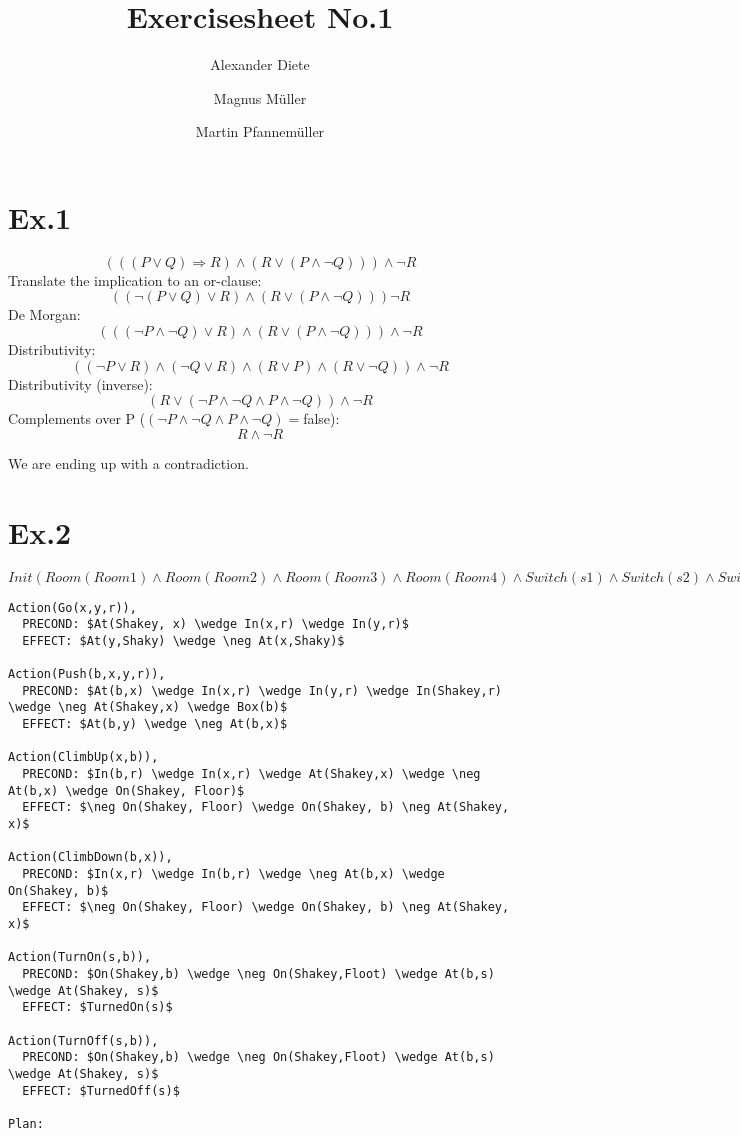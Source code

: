 \documentclass[11pt]{article}
\title{Exercisesheet No.1}
\author{Alexander Diete \and Magnus M\"uller \and Martin Pfannem\"uller}
\begin{document}
\maketitle
\section*{Ex.1}
$$(((P \vee Q) \Rightarrow R) \wedge (R \vee (P \wedge \neg Q))) \wedge \neg R$$
Translate the implication to an or-clause:
$$((\neg(P \vee Q) \vee R) \wedge (R \vee (P \wedge \neg Q))) \neg R$$
De Morgan:
$$(((\neg P \wedge \neg Q) \vee R) \wedge (R \vee (P \wedge \neg Q))) \wedge \neg R$$
Distributivity:
$$((\neg P \vee R) \wedge (\neg Q \vee R) \wedge (R \vee P) \wedge (R \vee \neg Q))\wedge \neg R$$
Distributivity (inverse):
$$(R \vee (\neg P \wedge \neg Q \wedge P \wedge \neg Q))\wedge \neg R$$
Complements over P ($(\neg P \wedge \neg Q \wedge P \wedge \neg Q) = $false):
$$R \wedge \neg R$$

We are ending up with a contradiction.

\section*{Ex.2}

$\displaystyle Init(Room(Room1) \wedge Room(Room2) \wedge Room(Room3) \wedge Room(Room4) \wedge Switch(s1) \wedge Switch(s2) \wedge Switch(s3) \wedge Switch(s4) \wedge Box(b1) \wedge Box(b2) \wedge Box(b3) \wedge Box(b4) \wedge At(Shakey,Floor) \wedge In(Shakey,Room3) \wedge TurnedOn(s4) \wedge TurnedOff(s3) \wedge TurnedOff(s2) \wedge TurnedOn(s1) \wedge In(b1,Room1) \wedge In(b2,Room1) \wedge In(b3,Room1) \wedge In(b4,Room1) \wedge At(b1,a) \wedge At(b2,b) \wedge At(b3,c) \wedge At(b4,d) \wedge At(Shakey,e))$

\begin{lstlisting}[mathescape=true]
Action(Go(x,y,r)),
  PRECOND: $At(Shakey, x) \wedge In(x,r) \wedge In(y,r)$
  EFFECT: $At(y,Shaky) \wedge \neg At(x,Shaky)$

Action(Push(b,x,y,r)),
  PRECOND: $At(b,x) \wedge In(x,r) \wedge In(y,r) \wedge In(Shakey,r) \wedge \neg At(Shakey,x) \wedge Box(b)$
  EFFECT: $At(b,y) \wedge \neg At(b,x)$  
  
Action(ClimbUp(x,b)),
  PRECOND: $In(b,r) \wedge In(x,r) \wedge At(Shakey,x) \wedge \neg At(b,x) \wedge On(Shakey, Floor)$
  EFFECT: $\neg On(Shakey, Floor) \wedge On(Shakey, b) \neg At(Shakey, x)$  

Action(ClimbDown(b,x)),
  PRECOND: $In(x,r) \wedge In(b,r) \wedge \neg At(b,x) \wedge On(Shakey, b)$
  EFFECT: $\neg On(Shakey, Floor) \wedge On(Shakey, b) \neg At(Shakey, x)$
  
Action(TurnOn(s,b)),
  PRECOND: $On(Shakey,b) \wedge \neg On(Shakey,Floot) \wedge At(b,s) \wedge At(Shakey, s)$
  EFFECT: $TurnedOn(s)$

Action(TurnOff(s,b)),
  PRECOND: $On(Shakey,b) \wedge \neg On(Shakey,Floot) \wedge At(b,s) \wedge At(Shakey, s)$
  EFFECT: $TurnedOff(s)$

Plan:

\end{lstlisting}
\end{document}
